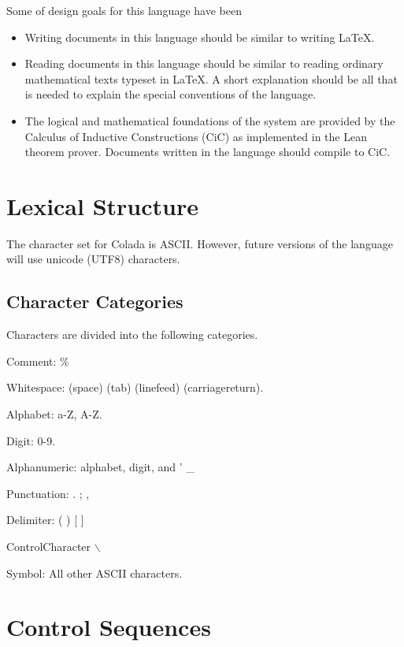 Some of design goals for this language have been
\begin{itemize}
\item Writing documents in this language
  should be similar to writing \LaTeX.
\item Reading documents in this language should be similar to reading
  ordinary mathematical texts typeset in \LaTeX.  A short explanation
  should be all that is needed to explain the special conventions of
  the language.
\item The logical and mathematical foundations of the system are
  provided by the Calculus of Inductive Constructions (CiC) as
  implemented in the Lean theorem prover.  Documents written in the
  language should compile to CiC.
\end{itemize}









\section{Lexical Structure}

The character set for Colada is ASCII.  However, future
versions of the language will use unicode (UTF8) characters.

\subsection{Character Categories}

Characters are divided into the following categories.

Comment: \% 

Whitespace: (space) (tab) (linefeed) (carriagereturn).

Alphabet: a-Z, A-Z.

Digit: 0-9.

Alphanumeric: alphabet, digit, and ' \_

Punctuation: . ; ,

Delimiter: ( ) [ ] { }

ControlCharacter $\backslash$

Symbol:  All other ASCII characters.


\section{Control Sequences}

\section{}

